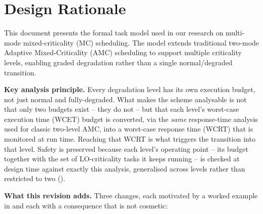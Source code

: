 
\section{Design Rationale}
\label{sec:design-rationale}

This document presents the formal task model used in our research on multi-mode
mixed-criticality (MC) scheduling. The model extends traditional two-mode
Adaptive Mixed-Criticality (AMC) scheduling to support multiple criticality
levels, enabling graded degradation rather than a single normal/degraded
transition.

\textbf{Key analysis principle.} Every degradation level has its own execution
budget, not just normal and fully-degraded. What makes the scheme analysable is
not that only two budgets exist -- they do not -- but that each level's
worst-case execution time (WCET) budget is converted, via the \emph{same}
response-time analysis used for classic two-level AMC, into a worst-case
response time (WCRT) that is monitored at run time. Reaching that WCRT is what
triggers the transition into that level. Safety is preserved because each
level's operating point -- its budget together with the set of LO-criticality
tasks it keeps running -- is checked at design time against exactly this
analysis, generalised across levels rather than restricted to two
().

\textbf{What this revision adds.} Three changes, each motivated by a worked
example in  and each with a consequence that is not
cosmetic:

